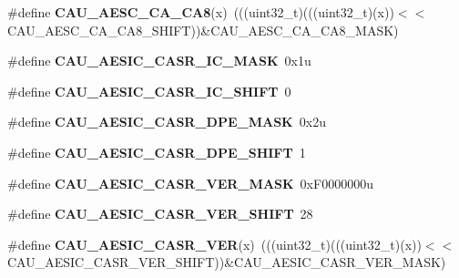 \begin{DoxyCompactItemize}
\item 
\#define {\bfseries C\+A\+U\+\_\+\+A\+E\+S\+C\+\_\+\+C\+A\+\_\+\+C\+A8}(x)~(((uint32\+\_\+t)(((uint32\+\_\+t)(x))$<$$<$C\+A\+U\+\_\+\+A\+E\+S\+C\+\_\+\+C\+A\+\_\+\+C\+A8\+\_\+\+S\+H\+I\+FT))\&C\+A\+U\+\_\+\+A\+E\+S\+C\+\_\+\+C\+A\+\_\+\+C\+A8\+\_\+\+M\+A\+SK)\hypertarget{group__CAU__Register__Masks_ga6fb99abe4a05fc7f273d40ce62d42c3e}{}\label{group__CAU__Register__Masks_ga6fb99abe4a05fc7f273d40ce62d42c3e}

\item 
\#define {\bfseries C\+A\+U\+\_\+\+A\+E\+S\+I\+C\+\_\+\+C\+A\+S\+R\+\_\+\+I\+C\+\_\+\+M\+A\+SK}~0x1u\hypertarget{group__CAU__Register__Masks_gacb80d3117440c08ed94005920ea5fb39}{}\label{group__CAU__Register__Masks_gacb80d3117440c08ed94005920ea5fb39}

\item 
\#define {\bfseries C\+A\+U\+\_\+\+A\+E\+S\+I\+C\+\_\+\+C\+A\+S\+R\+\_\+\+I\+C\+\_\+\+S\+H\+I\+FT}~0\hypertarget{group__CAU__Register__Masks_gaea31527fd7f5ac33f8a4eacdb62ae8bd}{}\label{group__CAU__Register__Masks_gaea31527fd7f5ac33f8a4eacdb62ae8bd}

\item 
\#define {\bfseries C\+A\+U\+\_\+\+A\+E\+S\+I\+C\+\_\+\+C\+A\+S\+R\+\_\+\+D\+P\+E\+\_\+\+M\+A\+SK}~0x2u\hypertarget{group__CAU__Register__Masks_gafd8cf2f0aa0a4475cc5352b023839e02}{}\label{group__CAU__Register__Masks_gafd8cf2f0aa0a4475cc5352b023839e02}

\item 
\#define {\bfseries C\+A\+U\+\_\+\+A\+E\+S\+I\+C\+\_\+\+C\+A\+S\+R\+\_\+\+D\+P\+E\+\_\+\+S\+H\+I\+FT}~1\hypertarget{group__CAU__Register__Masks_ga45aa7619f775385221648659d5303807}{}\label{group__CAU__Register__Masks_ga45aa7619f775385221648659d5303807}

\item 
\#define {\bfseries C\+A\+U\+\_\+\+A\+E\+S\+I\+C\+\_\+\+C\+A\+S\+R\+\_\+\+V\+E\+R\+\_\+\+M\+A\+SK}~0x\+F0000000u\hypertarget{group__CAU__Register__Masks_ga7c4921877f2a358cf58b360ae349d6e4}{}\label{group__CAU__Register__Masks_ga7c4921877f2a358cf58b360ae349d6e4}

\item 
\#define {\bfseries C\+A\+U\+\_\+\+A\+E\+S\+I\+C\+\_\+\+C\+A\+S\+R\+\_\+\+V\+E\+R\+\_\+\+S\+H\+I\+FT}~28\hypertarget{group__CAU__Register__Masks_gac5a230498e5cdfde6c562f568d90acbf}{}\label{group__CAU__Register__Masks_gac5a230498e5cdfde6c562f568d90acbf}

\item 
\#define {\bfseries C\+A\+U\+\_\+\+A\+E\+S\+I\+C\+\_\+\+C\+A\+S\+R\+\_\+\+V\+ER}(x)~(((uint32\+\_\+t)(((uint32\+\_\+t)(x))$<$$<$C\+A\+U\+\_\+\+A\+E\+S\+I\+C\+\_\+\+C\+A\+S\+R\+\_\+\+V\+E\+R\+\_\+\+S\+H\+I\+FT))\&C\+A\+U\+\_\+\+A\+E\+S\+I\+C\+\_\+\+C\+A\+S\+R\+\_\+\+V\+E\+R\+\_\+\+M\+A\+SK)\hypertarget{group__CAU__Register__Masks_ga83b8e9f334baf5a5cae0e96e17afa8f8}{}\label{group__CAU__Register__Masks_ga83b8e9f334baf5a5cae0e96e17afa8f8}


\end{DoxyCompactItemize}
